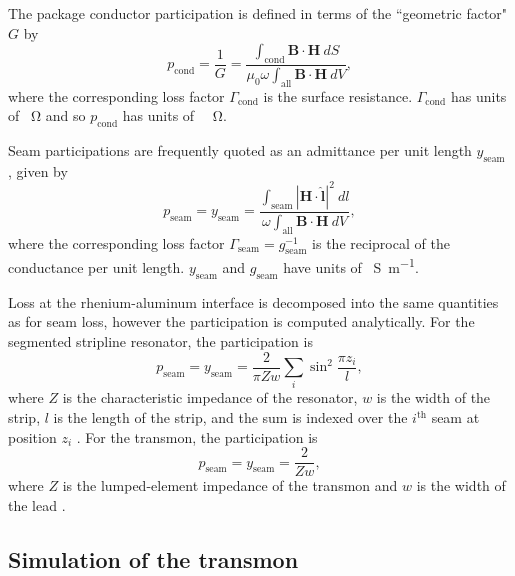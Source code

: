 \documentclass[
    reprint,
    superscriptaddress,
    amsmath,amssymb,
    aps,
    prb,
    floatfix,
]{revtex4-2}
\begin{document}
The package conductor participation is defined in terms of the ``geometric factor" $G$ by
\begin{equation}
    p_\mathrm{cond}=\frac{1}{G}
    =\frac{\int_\mathrm{cond}\mathbf{B}\cdot\mathbf{H}~dS}{\mu_0\omega\int_\mathrm{all}\mathbf{B}\cdot\mathbf{H}~dV},
    \label{eq:conductor}
\end{equation}
where the corresponding loss factor $\Gamma_\mathrm{cond}$ is the surface resistance. $\Gamma_\mathrm{cond}$ has units of \SI{}{\ohm} and so $p_\mathrm{cond}$ has units of \SI{}{\per\ohm}.

Seam participations are frequently quoted as an admittance per unit length $y_\mathrm{seam}$ \cite{brecht2015,lei2020,lei2023,ganjam2024,krayzman2024}, given by
\begin{equation}
    p_\mathrm{seam}=y_\mathrm{seam}
    =\frac{\int_\mathrm{seam}\left|\mathbf{H}\cdot\hat{\bm{l}}\right|^2~dl}{\omega\int_\mathrm{all}\mathbf{B}\cdot\mathbf{H}~dV},
    \label{eq:seam}
\end{equation}
where the corresponding loss factor $\Gamma_\mathrm{seam}=g_\mathrm{seam}^{-1}$ is the reciprocal of the conductance per unit length. $y_\mathrm{seam}$ and $g_\mathrm{seam}$ have units of \SI{}{\siemens\per\meter}.

Loss at the rhenium-aluminum interface is decomposed into the same quantities as for seam loss, however the participation is computed analytically. For the segmented stripline resonator, the participation is
\begin{equation}
    p_\mathrm{seam}=y_\mathrm{seam}=\frac{2}{\pi Zw}\sum_i \sin^2{\frac{\pi z_i}{l}},
\end{equation}
where $Z$ is the characteristic impedance of the resonator, $w$ is the width of the strip, $l$ is the length of the strip, and the sum is indexed over the $i^\mathrm{th}$ seam at position $z_i$ \cite{ganjam2024}. For the transmon, the participation is
\begin{equation}
    p_\mathrm{seam}=y_\mathrm{seam}=\frac{2}{Zw},
\end{equation}
where $Z$ is the lumped-element impedance of the transmon and $w$ is the width of the lead \cite{ganjam2024}.

\subsection{Simulation of the transmon}
\end{document}
